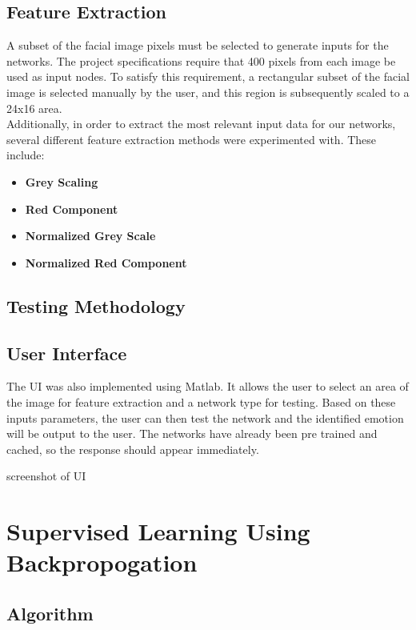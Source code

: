 \documentclass[ece]{uw-wkrpt}
\begin{document}
\subsection{Feature Extraction}
A subset of  the facial image pixels must be selected to generate inputs for the networks. The project specifications require that 400 pixels from each image be used as input nodes. To satisfy this requirement, a rectangular subset of the facial image is selected manually by the user, and this region is subsequently scaled to a 24x16 area.
\\
 Additionally, in order to extract the most relevant input data for our networks, several different feature extraction methods were experimented with. These include:
 
 \begin{itemize}
\item \textbf{Grey Scaling}

\item \textbf{Red Component}
\item \textbf{ Normalized Grey Scale}
\item \textbf{Normalized Red Component}
\end{itemize}
 



\subsection{Testing Methodology}




\subsection{User Interface}
The UI was also implemented using Matlab. It allows the user to select an area of the image for feature extraction and a network type for testing. Based on these inputs parameters, the user can then test the network and the identified emotion will be output to the user.  The networks have already been pre trained and cached, so the response should appear immediately. 

{screenshot of UI}

\pagebreak

\section{Supervised Learning Using Backpropogation}
\subsection{ Algorithm}
\end{document}
